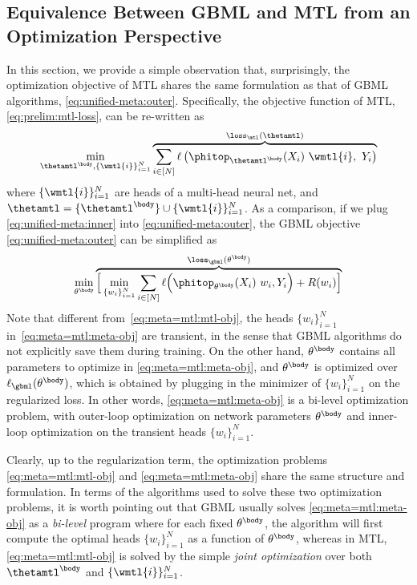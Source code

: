\documentclass{article}
\begin{document}
\subsection{Equivalence Between GBML and MTL from an Optimization Perspective}
In this section, we provide a simple observation that, surprisingly, the optimization objective of MTL shares the same formulation as that of GBML algorithms, \eqref{eq:unified-meta:outer}. Specifically, the objective function of MTL, \eqref{eq:prelim:mtl-loss}, can be re-written as
\begin{align}\label{eq:meta=mtl:mtl-obj}
   \min_{\thetamtl^\body, \{\wmtl{i}\}_{i=1}^N}
    \overbrace{\sum_{i\in [N]} \ell \left(\phitop_{\thetamtl^\body}(X_i)~\wmtl{i}, ~Y_i\right)}^{\loss_\mtl(\thetamtl)} 
\end{align}
where $\{\wmtl{i}\}_{i=1}^N$ are heads of a multi-head neural net, and $\thetamtl=\{\thetamtl^\body\}\cup\{\wmtl{i}\}_{i=1}^N$. As a comparison, if we plug \eqref{eq:unified-meta:inner} into \eqref{eq:unified-meta:outer}, the GBML objective \eqref{eq:unified-meta:outer} can be simplified as
\begin{align}\label{eq:meta=mtl:meta-obj}
    \min_{\theta^\body} \overbrace{\Big[\min_{\{w_i\}_{i=1}^N} \sum_{i\in[N]} \ell \Big(\phitop_{\theta^\body}(X_{i})~w_i, Y_{i}\Big) + R(w_i)\Big]}^{\loss_\gbml(\theta^\body)}
\end{align}
Note that different from~\eqref{eq:meta=mtl:mtl-obj}, the heads $\{w_i\}_{i=1}^N$ in~\eqref{eq:meta=mtl:meta-obj} are transient, in the sense that GBML algorithms do not explicitly save them during training. On the other hand, $\theta^\body$ contains all parameters to optimize in \eqref{eq:meta=mtl:meta-obj}, and $\theta^\body$ is optimized over $\ell_\gbml(\theta^\body)$, which is obtained by plugging in the minimizer of $\{w_i\}_{i=1}^N$ on the regularized loss. In other words, \eqref{eq:meta=mtl:meta-obj} is a bi-level optimization problem, with outer-loop optimization on network parameters $\theta^\body$ and inner-loop optimization on the transient heads $\{w_i\}_{i=1}^N$.

Clearly, up to the regularization term, the optimization problems \eqref{eq:meta=mtl:mtl-obj} and \eqref{eq:meta=mtl:meta-obj} share the same structure and formulation. In terms of the algorithms used to solve these two optimization problems, it is worth pointing out that GBML usually solves \eqref{eq:meta=mtl:meta-obj} as a \textit{bi-level} program where for each fixed $\theta^\body$, the algorithm will first compute the optimal heads $\{w_i\}_{i=1}^N$ as a function of $\theta^\body$, whereas in MTL,  \eqref{eq:meta=mtl:mtl-obj} is solved by the simple \textit{joint optimization} over both $\thetamtl^\body$ and $\{\wmtl{i}\}_{i=1}^N$.
\end{document}
